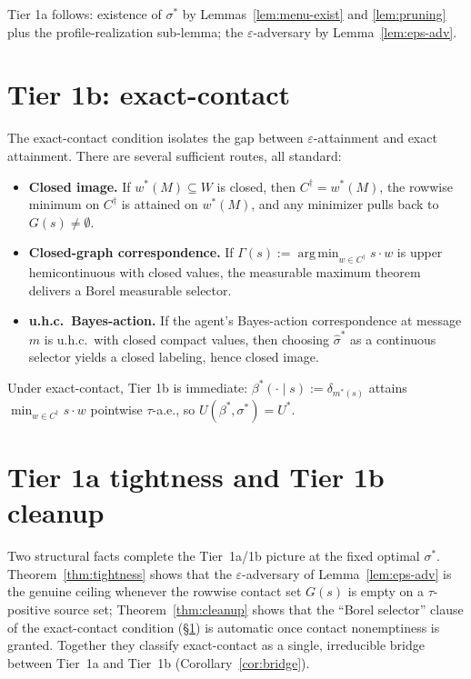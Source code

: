 \documentclass[11pt]{article}
\theoremstyle{definition}
\theoremstyle{remark}
\newcommand{\eps}{\varepsilon}
\newcommand{\argmin}{\operatorname*{arg\,min}}
\begin{document}
Tier 1a follows: existence of $\sigma^*$ by Lemmas~\ref{lem:menu-exist}
and \ref{lem:pruning} plus the profile-realization sub-lemma; the
$\eps$-adversary by Lemma~\ref{lem:eps-adv}.

\section{Tier 1b: exact-contact}\label{sec:tier1b}

The exact-contact condition isolates the gap between
$\eps$-attainment and exact attainment. There are several
sufficient routes, all standard:

\begin{itemize}[leftmargin=2em]
\item \textbf{Closed image.} If $w^*(M)\subseteq W$ is closed, then
$C^\dagger = w^*(M)$, the rowwise minimum on $C^\dagger$ is attained
on $w^*(M)$, and any minimizer pulls back to $G(s)\ne\emptyset$.
\item \textbf{Closed-graph correspondence.} If
$\Gamma(s) := \argmin_{w\in C^\dagger}s\cdot w$ is upper hemicontinuous
with closed values, the measurable maximum theorem
\cite[Thm.~18.19]{AliprantisBorder2006} delivers a Borel measurable
selector.
\item \textbf{u.h.c.\ Bayes-action.} If the agent's Bayes-action
correspondence at message $m$ is u.h.c.\ with closed compact values,
then choosing $\hat\sigma^*$ as a continuous selector yields a closed
labeling, hence closed image.
\end{itemize}

Under exact-contact, Tier 1b is immediate: $\beta^*(\cdot\mid s) := \delta_{m^*(s)}$
attains $\min_{w\in C^\dagger}s\cdot w$ pointwise $\tau$-a.e., so
$U(\beta^*,\sigma^*) = U^*$.

\section{Tier 1a tightness and Tier 1b cleanup}\label{sec:tightness}

Two structural facts complete the Tier~1a/1b picture at the fixed
optimal $\sigma^*$. Theorem~\ref{thm:tightness} shows that the
$\eps$-adversary of Lemma~\ref{lem:eps-adv} is the genuine ceiling
whenever the rowwise contact set $G(s)$ is empty on a $\tau$-positive
source set; Theorem~\ref{thm:cleanup} shows that the ``Borel
selector'' clause of the exact-contact condition (\S\ref{sec:tier1b})
is automatic once contact nonemptiness is granted. Together they
classify exact-contact as a single, irreducible bridge between
Tier~1a and Tier~1b (Corollary~\ref{cor:bridge}).
\end{document}
